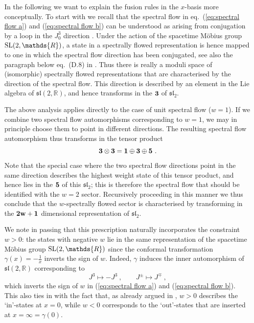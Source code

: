 \documentclass[12pt,a4paper]{article}
\newcommand{\be}{\begin{equation}}
\newcommand{\ee}{\end{equation}}
\begin{document}
In the following we want to explain the fusion rules in the $x$-basis more conceptually. To start with we recall that the spectral flow in eq.~(\ref{eq:spectral flow a}) and (\ref{eq:spectral flow b}) can be understood as arising from conjugation by a loop in the $J^3_0$ direction \cite{PS,Gaberdiel:1995yk}. Under the action of the spacetime M\"obius group ${\rm SL}(2,\mathds{R})$, a state in a spectrally flowed representation is hence mapped to one in which the spectral flow direction has been conjugated, see also the paragraph below eq.~(D.8) in \cite{Maldacena:2001km}. Thus there is really a moduli space of (isomorphic) spectrally flowed representations that are characterised by the direction of the spectral flow. This direction is described by an element in the Lie algebra of $\mathfrak{sl}(2,\mathds{R})$, and hence transforms in the ${\bf 3}$ of $\mathfrak{sl}_2$. 

The above analysis applies directly to the case of unit spectral flow ($w=1$). If we combine two spectral flow automorphisms corresponding to $w=1$, we may in principle choose them to point in different directions. The resulting spectral flow automorphism thus transforms in the tensor product 
\be
{\bf 3} \otimes {\bf 3} = {\bf 1} \oplus {\bf 3} \oplus {\bf 5} \ . 
\ee
Note that the special case where the two spectral flow directions point in the same direction describes the highest weight state of this tensor product, and hence lies in the ${\bf 5}$ of this $\mathfrak{sl}_2$; this is therefore the spectral flow that should be identified with the $w=2$ sector. Recursively proceeding in this manner we thus conclude that the $w$-spectrally flowed sector is characterised by transforming in the ${\bf 2w+1}$ dimensional representation of $\mathfrak{sl}_2$.

We note in passing that this prescription naturally incorporates the constraint $w > 0$:  the states with negative $w$ lie in the same representation of the spacetime M\"obius group ${\rm SL}(2,\mathds{R})$ since the conformal transformation $\gamma(x)= - \tfrac{1}{x}$ inverts the sign of $w$. Indeed, $\gamma$ induces the inner automorphism of $\mathfrak{sl}(2,\mathds{R})$ corresponding to 
\be
J^3 \mapsto - J^3 \ , \qquad J^\pm \mapsto J^\mp \ , 
\ee
which inverts the sign of $w$ in (\ref{eq:spectral flow a}) and (\ref{eq:spectral flow b}). This also ties in with the fact that, as already argued in \cite{Maldacena:2001km}, $w>0$ describes the  `in'-states at $x=0$, while $w<0$ corresponds to the `out'-states that are inserted at $x=\infty=\gamma(0)$. 
\end{document}
